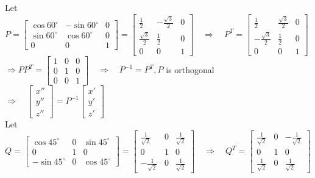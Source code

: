 \documentclass[12pt]{book}
\begin{document}
\begin{CJK}{UTF8}{bsmi}
\begin{minipage}[t]{\dimexpr\linewidth-2em}
Let $P=\begin{bmatrix}
\cos60^\circ & -\sin60^\circ & 0 \\
\sin60^\circ &  \cos60^\circ & 0 \\
0    & 0    & 1 
\end{bmatrix}=\begin{bmatrix}
\frac{1}{2} & -\frac{\sqrt{3}}{2} & 0 \\
\frac{\sqrt{3}}{2} & \frac{1}{2}  & 0 \\
0    & 0    & 1
\end{bmatrix}\quad\Rightarrow\quad P^T=\begin{bmatrix}
\frac{1}{2} &  \frac{\sqrt{3}}{2} & 0 \\
-\frac{\sqrt{3}}{2} & \frac{1}{2} & 0 \\
0    & 0    & 1
\end{bmatrix}$ \\
$\Rightarrow PP^T=\begin{bmatrix}
1 & 0 & 0 \\
0 & 1 & 0 \\
0 & 0 & 1
\end{bmatrix}\quad\Rightarrow\quad P^{-1}=P^T, P$ is orthogonal\quad$\Rightarrow\quad\begin{bmatrix}
x'' \\ y'' \\ z''
\end{bmatrix}=P^{-1}\begin{bmatrix}
x' \\ y' \\ z'
\end{bmatrix}$ \\
Let $Q=\begin{bmatrix}
\cos45^\circ & 0 & \sin45^\circ \\
0 & 1 & 0 \\
-\sin45^\circ & 0 & \cos45^\circ
\end{bmatrix}=\begin{bmatrix}
\frac{1}{\sqrt{2}} & 0 & \frac{1}{\sqrt{2}} \\
0 & 1 & 0 \\
-\frac{1}{\sqrt{2}} & 0 & \frac{1}{\sqrt{2}}
\end{bmatrix}\quad\Rightarrow\quad Q^T=\begin{bmatrix}
\frac{1}{\sqrt{2}} & 0 & -\frac{1}{\sqrt{2}} \\
0 & 1 & 0 \\
\frac{1}{\sqrt{2}} & 0 &  \frac{1}{\sqrt{2}}
\end{bmatrix}$ \\

\end{minipage}
\end{CJK}
\end{document}

